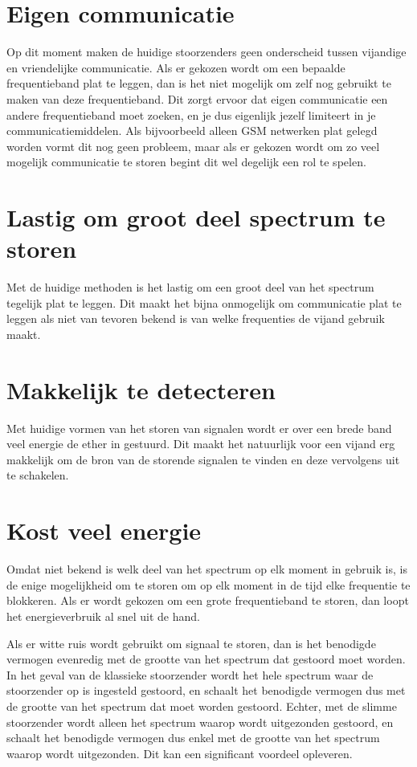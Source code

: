 \documentclass[oneside, a4paper, openany]{memoir}
\begin{document}
\section{Eigen communicatie}
Op dit moment maken de huidige stoorzenders geen onderscheid tussen vijandige en vriendelijke communicatie. Als er gekozen wordt om een bepaalde frequentieband plat te leggen, dan is het niet mogelijk om zelf nog gebruikt te maken van deze frequentieband. Dit zorgt ervoor dat eigen communicatie een andere frequentieband moet zoeken, en je dus eigenlijk jezelf limiteert in je communicatiemiddelen. Als bijvoorbeeld alleen GSM netwerken plat gelegd worden vormt dit nog geen probleem, maar als er gekozen wordt om zo veel mogelijk communicatie te storen begint dit wel degelijk een rol te spelen.

\section{Lastig om groot deel spectrum te storen}
Met de huidige methoden is het lastig om een groot deel van het spectrum tegelijk plat te leggen. Dit maakt het bijna onmogelijk om communicatie plat te leggen als niet van tevoren bekend is van welke frequenties de vijand gebruik maakt.

\section{Makkelijk te detecteren}
Met huidige vormen van het storen van signalen wordt er over een brede band veel energie de ether in gestuurd. Dit maakt het natuurlijk voor een vijand erg makkelijk om de bron van de storende signalen te vinden en deze vervolgens uit te schakelen.

\section{Kost veel energie}
Omdat niet bekend is welk deel van het spectrum op elk moment in gebruik is, is de enige mogelijkheid om te storen om op elk moment in de tijd elke frequentie te blokkeren. Als er wordt gekozen om een grote frequentieband te storen, dan loopt het energieverbruik al snel uit de hand.

\begin{blockDetail}
    Als er witte ruis wordt gebruikt om signaal te storen, dan is het benodigde vermogen evenredig met de grootte van het spectrum dat gestoord moet worden. In het geval van de klassieke stoorzender wordt het hele spectrum waar de stoorzender op is ingesteld gestoord, en schaalt het benodigde vermogen dus met de grootte van het spectrum dat moet worden gestoord. Echter, met de slimme stoorzender wordt alleen het spectrum waarop wordt uitgezonden gestoord, en schaalt het benodigde vermogen dus enkel met de grootte van het spectrum waarop wordt uitgezonden. Dit kan een significant voordeel opleveren.
\end{blockDetail}
\end{document}
